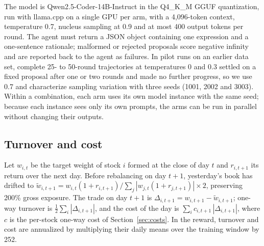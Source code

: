\documentclass[preprint,12pt,authoryear]{elsarticle}
\begin{document}
The model is Qwen2.5-Coder-14B-Instruct in the Q4\_K\_M GGUF quantization, run with llama.cpp on a single GPU per arm, with a 4,096-token context, temperature 0.7, nucleus sampling at 0.9 and at most 400 output tokens per round. The agent must return a JSON object containing one expression and a one-sentence rationale; malformed or rejected proposals score negative infinity and are reported back to the agent as failures. In pilot runs on an earlier data set, complete 25- to 50-round trajectories at temperatures 0 and 0.3 settled on a fixed proposal after one or two rounds and made no further progress, so we use 0.7 and characterize sampling variation with three seeds (1001, 2002 and 3003). Within a combination, each arm uses its own model instance with the same seed; because each instance sees only its own prompts, the arms can be run in parallel without changing their outputs.

\subsection{Turnover and cost}\label{app:turnover}

Let $w_{i,t}$ be the target weight of stock $i$ formed at the close of day $t$ and $r_{i,t+1}$ its return over the next day. Before rebalancing on day $t+1$, yesterday's book has drifted to $\tilde w_{i,t+1} = w_{i,t}(1+r_{i,t+1}) / \sum_j |w_{j,t}(1+r_{j,t+1})| \times 2$, preserving 200\% gross exposure. The trade on day $t+1$ is $\Delta_{i,t+1} = w_{i,t+1} - \tilde w_{i,t+1}$; one-way turnover is $\tfrac{1}{2}\sum_i |\Delta_{i,t+1}|$, and the cost of the day is $\sum_i c_{i,t+1}\,|\Delta_{i,t+1}|$, where $c$ is the per-stock one-way cost of Section~\ref{sec:costs}. In the reward, turnover and cost are annualized by multiplying their daily means over the training window by 252.
\end{document}

